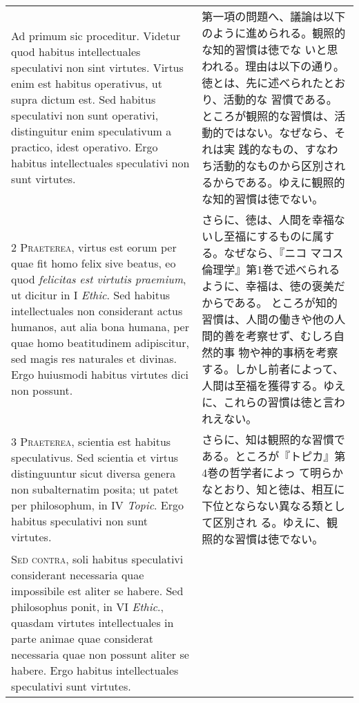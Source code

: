 \documentclass[10pt]{jsarticle}
\begin{document}
\begin{longtable}{p{21em}p{21em}}

{\huge A}{\sc d primum sic proceditur}.  Videtur quod habitus
intellectuales speculativi non sint virtutes. Virtus enim est habitus
operativus, ut supra dictum est. Sed habitus speculativi non sunt
operativi, distinguitur enim speculativum a practico, idest
operativo. Ergo habitus intellectuales speculativi non sunt virtutes.

&

第一項の問題へ、議論は以下のように進められる。観照的な知的習慣は徳でな
いと思われる。理由は以下の通り。徳とは、先に述べられたとおり、活動的な
習慣である。ところが観照的な習慣は、活動的ではない。なぜなら、それは実
践的なもの、すなわち活動的なものから区別されるからである。ゆえに観照的
な知的習慣は徳でない。

\\

{\scshape 2 Praeterea}, virtus est eorum per quae fit homo felix sive
 beatus, eo quod {\itshape felicitas est virtutis praemium}, ut
 dicitur in I {\itshape Ethic}. Sed habitus intellectuales non
 considerant actus humanos, aut alia bona humana, per quae homo
 beatitudinem adipiscitur, sed magis res naturales et divinas. Ergo
 huiusmodi habitus virtutes dici non possunt.

&

さらに、徳は、人間を幸福ないし至福にするものに属する。なぜなら、『ニコ
マコス倫理学』第1巻で述べられるように、幸福は、徳の褒美だからである。
ところが知的習慣は、人間の働きや他の人間的善を考察せず、むしろ自然的事
物や神的事柄を考察する。しかし前者によって、人間は至福を獲得する。ゆえ
に、これらの習慣は徳と言われえない。

\\

{\scshape 3 Praeterea}, scientia est habitus speculativus. Sed
 scientia et virtus distinguuntur sicut diversa genera non
 subalternatim posita; ut patet per philosophum, in IV {\itshape
 Topic}. Ergo habitus speculativi non sunt virtutes.

&

さらに、知は観照的な習慣である。ところが『トピカ』第4巻の哲学者によっ
て明らかなとおり、知と徳は、相互に下位とならない異なる類として区別され
る。ゆえに、観照的な習慣は徳でない。

\\

{\scshape Sed contra}, soli habitus speculativi considerant necessaria
 quae impossibile est aliter se habere. Sed philosophus ponit, in VI
 {\itshape Ethic}., quasdam virtutes intellectuales in parte animae
 quae considerat necessaria quae non possunt aliter se habere. Ergo
 habitus intellectuales speculativi sunt virtutes.


\end{longtable}
\end{document}
